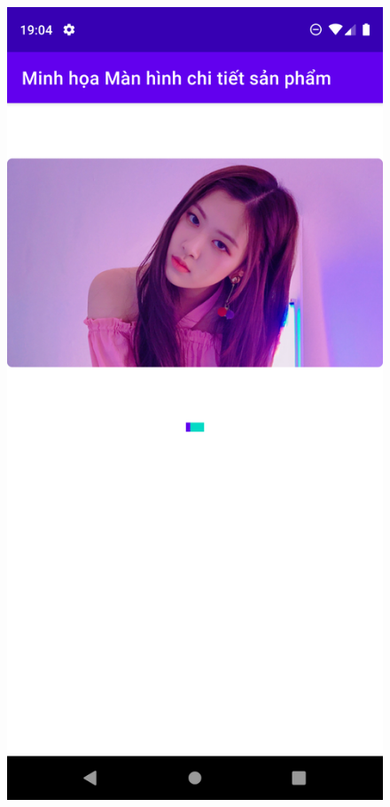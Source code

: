 \documentclass{beamer}
\begin{document}
\begin{frame}
    \begin{columns}
        \begin{figure}
            \centering
            \includegraphics[height=0.7\textheight]{images/30.png}

\end{figure}
\end{columns}
\end{frame}
\end{document}
